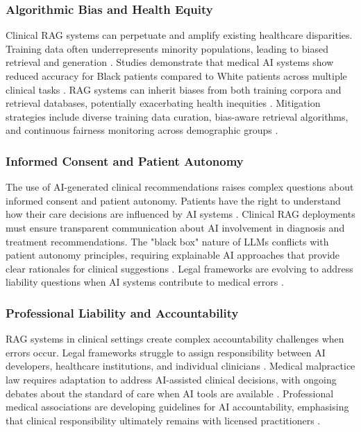 \subsubsection{Algorithmic Bias and Health Equity}
Clinical RAG systems can perpetuate and amplify existing healthcare disparities. Training data often underrepresents minority populations, leading to biased retrieval and generation \citep{rajkomar2018ensuring}. Studies demonstrate that medical AI systems show reduced accuracy for Black patients compared to White patients across multiple clinical tasks \citep{obermeyer2019dissecting}. RAG systems can inherit biases from both training corpora and retrieval databases, potentially exacerbating health inequities \citep{chen2023health}. Mitigation strategies include diverse training data curation, bias-aware retrieval algorithms, and continuous fairness monitoring across demographic groups \citep{mehrabi2021survey}.

\subsubsection{Informed Consent and Patient Autonomy}
The use of AI-generated clinical recommendations raises complex questions about informed consent and patient autonomy. Patients have the right to understand how their care decisions are influenced by AI systems \citep{beauchamp2019principles}. Clinical RAG deployments must ensure transparent communication about AI involvement in diagnosis and treatment recommendations. The "black box" nature of LLMs conflicts with patient autonomy principles, requiring explainable AI approaches that provide clear rationales for clinical suggestions \citep{holzinger2017makes}. Legal frameworks are evolving to address liability questions when AI systems contribute to medical errors \citep{price2019black}.

\subsubsection{Professional Liability and Accountability}
RAG systems in clinical settings create complex accountability challenges when errors occur. Legal frameworks struggle to assign responsibility between AI developers, healthcare institutions, and individual clinicians \citep{futoma2020myth}. Medical malpractice law requires adaptation to address AI-assisted clinical decisions, with ongoing debates about the standard of care when AI tools are available \citep{kesselheim2019artificial}. Professional medical associations are developing guidelines for AI accountability, emphasising that clinical responsibility ultimately remains with licensed practitioners \citep{ama2018augmented}.

